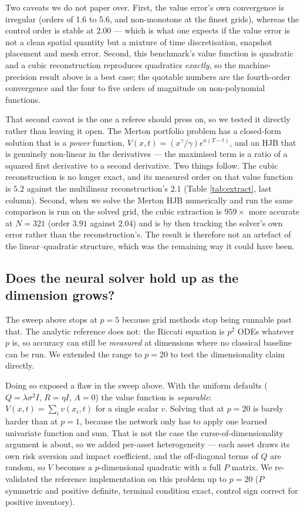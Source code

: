 \documentclass[conference]{IEEEtran}
\begin{document}
Two caveats we do not paper over. First, the value error's own convergence is irregular (orders of
1.6 to 5.6, and non-monotone at the finest grids), whereas the control order is stable at 2.00 ---
which is what one expects if the value error is not a clean spatial quantity but a mixture of time
discretisation, snapshot placement and mesh error. Second, this benchmark's value function is
quadratic and a cubic reconstruction reproduces quadratics \emph{exactly}, so the
machine-precision result above is a best case; the quotable numbers are the fourth-order
convergence and the four to five orders of magnitude on non-polynomial functions.

That second caveat is the one a referee should press on, so we tested it directly rather than
leaving it open. The Merton portfolio problem has a closed-form solution that is a \emph{power}
function, $V(x,t) = (x^\gamma/\gamma)e^{\kappa(T-t)}$, and an HJB that is genuinely non-linear in
the derivatives --- the maximised term is a ratio of a squared first derivative to a second
derivative. Two things follow. The cubic reconstruction is no longer exact, and its measured order
on that value function is $5.2$ against the multilinear reconstruction's $2.1$ (Table
\ref{tab:extract}, last column). Second, when we solve the Merton HJB numerically and run the same
comparison is run on the solved grid, the cubic extraction is $959\times$ more accurate at
$N=321$ (order $3.91$ against $2.04$) and is by then tracking the solver's own error rather than
the reconstruction's. The result is therefore not an artefact of the linear--quadratic structure,
which was the remaining way it could have been.

\subsection{Does the neural solver hold up as the dimension grows?}\label{sec:highdim}

The sweep above stops at $p=5$ because grid methods stop being runnable past that. The analytic
reference does not: the Riccati equation is $p^2$ ODEs whatever $p$ is, so accuracy can still be
\emph{measured} at dimensions where no classical baseline can be run. We extended the range to
$p=20$ to test the dimensionality claim directly.

Doing so exposed a flaw in the sweep above. With the uniform defaults
($Q=\lambda\sigma^2 I$, $R=\eta I$, $A=0$) the value function is \emph{separable}:
$V(x,t)=\sum_i v(x_i,t)$ for a single scalar $v$. Solving that at $p=20$ is barely harder than at
$p=1$, because the network only has to apply one learned univariate function and sum. That is not
the case the curse-of-dimensionality argument is about, so we added per-asset heterogeneity ---
each asset draws its own risk aversion and impact coefficient, and the off-diagonal terms of $Q$
are random, so $V$ becomes a $p$-dimensional quadratic with a full $P$ matrix. We
re-validated the reference implementation on this problem up to $p=20$ ($P$ symmetric and positive
definite, terminal condition exact, control sign correct for positive inventory).
\end{document}

